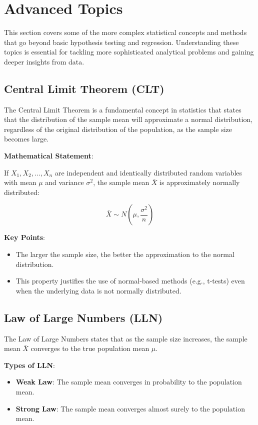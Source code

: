 \section{Advanced Topics}

This section covers some of the more complex statistical concepts and methods that go beyond basic hypothesis testing and regression. Understanding these topics is essential for tackling more sophisticated analytical problems and gaining deeper insights from data.

\subsection{Central Limit Theorem (CLT)}
The Central Limit Theorem is a fundamental concept in statistics that states that the distribution of the sample mean will approximate a normal distribution, regardless of the original distribution of the population, as the sample size becomes large.

\textbf{Mathematical Statement}:

If \(X_1, X_2, \ldots, X_n\) are independent and identically distributed random variables with mean \(\mu\) and variance \(\sigma^2\), the sample mean \(\bar{X}\) is approximately normally distributed:

\[
\bar{X} \sim N\left(\mu, \frac{\sigma^2}{n}\right)
\]

\textbf{Key Points}:
\begin{itemize}
    \item The larger the sample size, the better the approximation to the normal distribution.
    \item This property justifies the use of normal-based methods (e.g., t-tests) even when the underlying data is not normally distributed.
\end{itemize}

\subsection{Law of Large Numbers (LLN)}
The Law of Large Numbers states that as the sample size increases, the sample mean \(\bar{X}\) converges to the true population mean \(\mu\).

\textbf{Types of LLN}:
\begin{itemize}
    \item \textbf{Weak Law}: The sample mean converges in probability to the population mean.
    \item \textbf{Strong Law}: The sample mean converges almost surely to the population mean.
\end{itemize}

